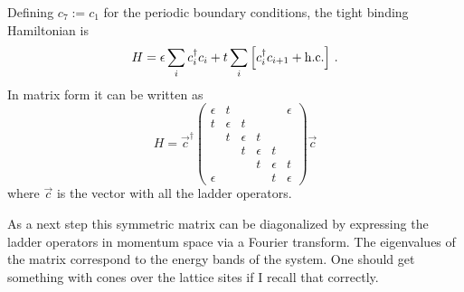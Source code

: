 \documentclass[11pt, english, fleqn, DIV=15, headinclude, BCOR=1cm]{scrartcl}
\begin{document}
Defining $c_7 := c_1$ for the periodic boundary conditions, the tight binding
Hamiltonian is
\[
    H = \epsilon \sum_i c_i^\dagger c_i + t \sum_i \left[ c_i^\dagger c_{i+1} +
    \mathrm{h.c.} \right] \,.
\]
In matrix form it can be written as
\[
    H = \vec c^\dagger
    \begin{pmatrix}
        \epsilon & t &&&& \epsilon \\
        t & \epsilon & t &&& \\
          & t & \epsilon & t && \\
          && t & \epsilon & t & \\
          &&& t & \epsilon & t  \\
        \epsilon &&&& t & \epsilon
    \end{pmatrix}
    \vec c
\]
where $\vec c$ is the vector with all the ladder operators.

As a next step this symmetric matrix can be diagonalized by expressing the
ladder operators in momentum space via a Fourier transform. The eigenvalues of
the matrix correspond to the energy bands of the system. One should get
something with cones over the lattice sites if I recall that correctly.
\end{document}
